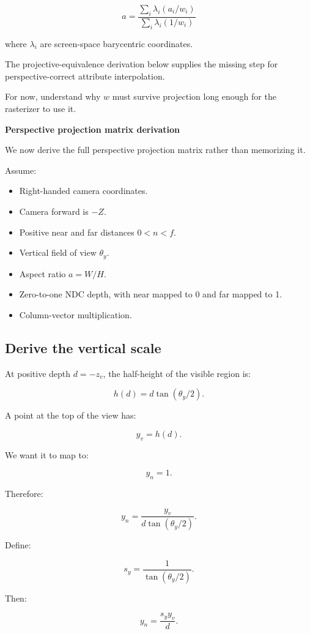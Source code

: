 \[
 \boxed{ a= \frac{ \sum_i\lambda_i(a_i/w_i) }{ \sum_i\lambda_i(1/w_i) } }
\]

where \(\lambda_i\) are screen-space barycentric coordinates.

The projective-equivalence derivation below supplies the missing step for perspective-correct attribute interpolation.

For now, understand why \(w\) must survive projection long enough for the rasterizer to use it.

\textbf{Perspective projection matrix derivation}

We now derive the full perspective projection matrix rather than memorizing it.

Assume:

\begin{itemize}
\tightlist
\item
  Right-handed camera coordinates.
\item
  Camera forward is \(-Z\).
\item
  Positive near and far distances \(0<n<f\).
\item
  Vertical field of view \(\theta_y\).
\item
  Aspect ratio \(a=W/H\).
\item
  Zero-to-one NDC depth, with near mapped to 0 and far mapped to 1.
\item
  Column-vector multiplication.
\end{itemize}

\subsection{Derive the vertical scale}\label{02-foundations-ii-ch033-derive-the-vertical-scale}

At positive depth \(d=-z_v\), the half-height of the visible region is:

\[
 h(d)=d\tan(\theta_y/2).
\]

A point at the top of the view has:

\[
 y_v=h(d).
\]

We want it to map to:

\[
 y_n=1.
\]

Therefore:

\[
 y_n= \frac{y_v}{d\tan(\theta_y/2)}.
\]

Define:

\[
 \boxed{ s_y=\frac1{\tan(\theta_y/2)} }.
\]

Then:

\[
 \boxed{ y_n=\frac{s_yy_v}{d} }.
\]

